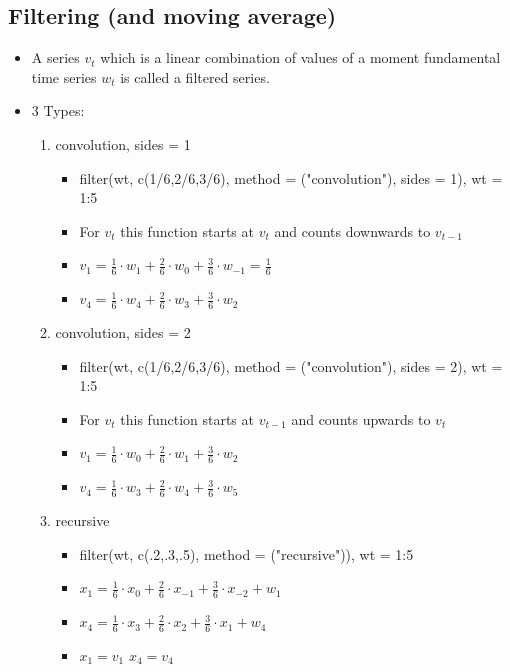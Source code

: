 \documentclass{article}
\begin{document}
\subsection{Filtering (and moving average)}

\begin{itemize}
    \item A series $v_t$ which is a linear combination of values of a moment fundamental time series $w_t$ is called a filtered series.
    \item 3 Types:
    \begin{enumerate}
        \item convolution, sides = 1
        \begin{itemize}
            \item filter(wt, c(1/6,2/6,3/6), method = ("convolution"), sides = 1), wt = 1:5
            \item For $v_t$ this function starts at $v_t$ and counts downwards to $v_{t-1}$
            \item $v_1 = \frac{1}{6} \cdot w_1 + \frac{2}{6} \cdot w_0 + \frac{3}{6}\cdot w_{-1} = \frac{1}{6}$
            \item $v_4 = \frac{1}{6} \cdot w_4 + \frac{2}{6} \cdot w_3 + \frac{3}{6}\cdot w_{2}$
        \end{itemize}
        \item convolution, sides = 2
        \begin{itemize}
            \item filter(wt, c(1/6,2/6,3/6), method = ("convolution"), sides = 2), wt = 1:5
            \item For $v_t$ this function starts at $v_{t-1}$ and counts upwards to $v_{t}$
            \item $v_1 = \frac{1}{6} \cdot w_0 + \frac{2}{6} \cdot w_1 + \frac{3}{6}\cdot w_{2}$
            \item $v_4 = \frac{1}{6} \cdot w_3 + \frac{2}{6} \cdot w_4 + \frac{3}{6}\cdot w_{5}$
        \end{itemize}
        \item recursive
        \begin{itemize}
            \item filter(wt, c(.2,.3,.5), method = ("recursive")), wt = 1:5
            \item $x_1 = \frac{1}{6} \cdot x_0 + \frac{2}{6} \cdot x_{-1} + \frac{3}{6} \cdot x_{-2} + w_1$
            \item $x_4 = \frac{1}{6} \cdot x_3 + \frac{2}{6} \cdot x_2 + \frac{3}{6} \cdot x_1 + w_4$
            \item $x_1 = v_1$ \hspace{1cm} $x_4 = v_4$
        \end{itemize}
    \end{enumerate}
\end{itemize}
\end{document}
